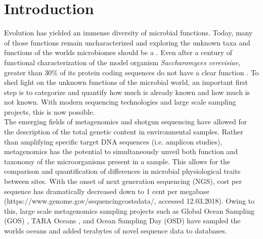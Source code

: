 \chapter{Introduction} %
\label{Chapter1} %

\renewcommand{\chaptermark}[1]{\markboth{#1}{}}
\renewcommand{\sectionmark}[1]{\markright{#1}}
\fancyhead[RE]{\small\leftmark}
\fancyhead[LO]{\small\rightmark}%


Evolution has yielded an immense diversity of microbial functions. Today, many of those functions remain uncharacterized and exploring the unknown taxa and functions of the world\textquotesingle s microbiomes should be a  \citep{Bernard_2018}. Even after a century of functional characterization of the model organism \textit{Saccharomyces cerevisiae}, greater than 30\% of its protein coding sequences do not have a clear function \citep{Ellens_2017}. To shed light on the unknown functions of the microbial world, an important first step is to categorize and quantify how much is already known and how much is not known. With modern sequencing technologies and large scale sampling projects, this is now possible.\\

The emerging fields of metagenomics and shotgun sequencing have allowed for the description of the total genetic content in environmental samples. Rather than amplifying specific target DNA sequences (i.e. amplicon studies), metagenomics has the potential to simultaneously unveil both function and taxonomy of the microorganisms present in a sample. This allows for the comparison and quantification of differences in microbial physiological traits between sites. With the onset of next generation sequencing (NGS), cost per sequence has dramatically decreased down to 1 cent per megabase (https://www.genome.gov/sequencingcostsdata/, accessed 12.03.2018). Owing to this, large scale metagenomics sampling projects such as Global Ocean Sampling (GOS) \citep{Rusch_2007}, TARA Oceans \citep{Sunagawa_2015}, and Ocean Sampling Day (OSD) \citep{Kopf_2015} have sampled the world\textquotesingle s oceans and added terabytes of novel sequence data to databases. \\

